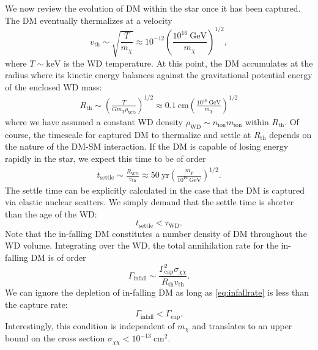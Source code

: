 \documentclass[preprintnumbers,amsmath,amssymb,prd,superscriptaddress]{revtex4}
\newcommand{\GeV}{\text{GeV}}
\newcommand{\keV}{\text{keV}}
\newcommand{\cm}{\text{cm}}
\def\r{\right)}
\def\l{\left(}
\begin{document}
We now review the evolution of DM within the star once it has been captured. 
The DM eventually thermalizes at a velocity
\begin{equation}
v_\text{th} \sim \sqrt{\frac{T}{m_\chi}} \approx 10^{-12} \l \frac{10^{16} ~\GeV}{m_\chi}\r^{1/2},
\end{equation}
where $T \sim \keV$ is the WD temperature.
At this point, the DM accumulates at the radius where its kinetic energy balances against the gravitational potential energy of the enclosed WD mass:
\begin{align}
  R_\text{th} \sim \l \frac{T}{G m_\chi \rho_\text{WD}}\r^{1/2} \approx 0.1 ~\cm \l \frac{10^{16} ~\GeV}{m_\chi}\r^{1/2}
\end{align}
where we have assumed a constant WD density $\rho_\text{WD} \sim n_\text{ion} m_\text{ion}$ within $R_\text{th}$.
Of course, the timescale for captured DM to thermalize and settle at $R_\text{th}$ depends on the nature of the DM-SM interaction.
If the DM is capable of losing energy rapidly in the star, we expect this time to be of order
\begin{align}
\label{eq:tdrift}
  t_\text{settle} \sim \frac{R_\text{WD}}{v_\text{th}}
  \approx 50 ~\text{yr} \l \frac{m_\chi}{10^{16} ~\GeV} \r^{1/2}. 
\end{align}
The settle time can be explicitly calculated in the case that the DM is captured via elastic nuclear scatters. 
We simply demand that the settle time is shorter than the age of the WD:
\begin{equation}
t_\text{settle} < \tau_\text{WD}.
\end{equation}
Note that the in-falling DM constitutes a number density of DM throughout the WD volume.
Integrating over the WD, the total annihilation rate for the in-falling DM is of order
\begin{equation}
\label{eq:infallrate}
\Gamma_\text{infall} \sim \frac{\Gamma_\text{cap}^2 \sigma_{\chi \chi}}{R_\text{th} v_\text{th}}.
\end{equation}
We can ignore the depletion of in-falling DM as long as \eqref{eq:infallrate} is less than the capture rate:
\begin{equation}
\label{eq:steadycollect}
\Gamma_\text{infall} < \Gamma_\text{cap}.
\end{equation}
Interestingly, this condition is independent of $m_\chi$ and translates to an upper bound on the cross section $\sigma_{\chi \chi} < 10^{-13} ~\text{cm}^2$. 
\end{document}
